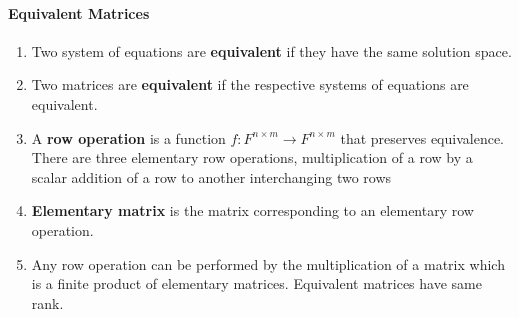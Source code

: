 \paragraph{Equivalent Matrices}
\begin{enumerate}
	\item Two system of equations are \textbf{equivalent} if they have the same solution space.
	\item Two matrices are \textbf{equivalent} if the respective systems of equations are equivalent.
	\item A \textbf{row operation} is a function $f : F^{n \times m} \to F^{n \times m}$ that preserves equivalence.
	There are three elementary row operations,
		\subitem multiplication of a row by a scalar
		\subitem addition of a row to another
		\subitem interchanging two rows
	\item \textbf{Elementary matrix} is the matrix corresponding to an elementary row operation.
	\item Any row operation can be performed by the multiplication of a matrix which is a finite product of elementary matrices.
		\subitem Equivalent matrices have same rank.
\end{enumerate}

